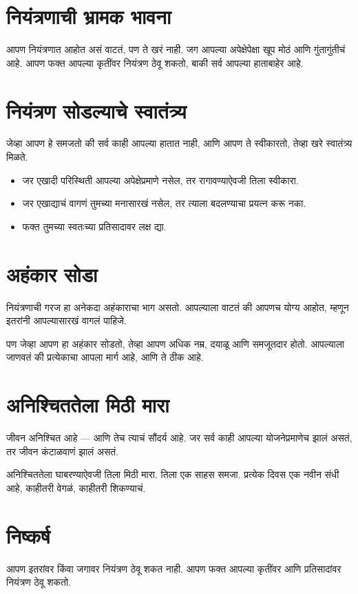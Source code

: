 \section*{नियंत्रणाची भ्रामक भावना}
आपण नियंत्रणात आहोत असं वाटतं,  
पण ते खरं नाही.  
जग आपल्या अपेक्षेपेक्षा खूप मोठं आणि गुंतागुंतीचं आहे.  
आपण फक्त आपल्या कृतींवर नियंत्रण ठेवू शकतो,  
बाकी सर्व आपल्या हाताबाहेर आहे.  

\section*{नियंत्रण सोडल्याचे स्वातंत्र्य}
जेव्हा आपण हे समजतो की सर्व काही आपल्या हातात नाही,  
आणि आपण ते स्वीकारतो,  
तेव्हा खरे स्वातंत्र्य मिळते.  

\begin{itemize}
\item जर एखादी परिस्थिती आपल्या अपेक्षेप्रमाणे नसेल, तर रागावण्याऐवजी तिला स्वीकारा.  
\item जर एखाद्याचं वागणं तुमच्या मनासारखं नसेल, तर त्याला बदलण्याचा प्रयत्न करू नका.  
\item फक्त तुमच्या स्वतःच्या प्रतिसादावर लक्ष द्या.  
\end{itemize}

\section*{अहंकार सोडा}
नियंत्रणाची गरज हा अनेकदा अहंकाराचा भाग असतो.  
आपल्याला वाटतं की आपणच योग्य आहोत,  
म्हणून इतरांनी आपल्यासारखं वागलं पाहिजे.  

पण जेव्हा आपण हा अहंकार सोडतो,  
तेव्हा आपण अधिक नम्र, दयाळू आणि समजूतदार होतो.  
आपल्याला जाणवतं की प्रत्येकाचा आपला मार्ग आहे,  
आणि ते ठीक आहे.  

\section*{अनिश्चिततेला मिठी मारा}
जीवन अनिश्चित आहे — आणि तेच त्याचं सौंदर्य आहे.  
जर सर्व काही आपल्या योजनेप्रमाणेच झालं असतं,  
तर जीवन कंटाळवाणं झालं असतं.  

अनिश्चिततेला घाबरण्याऐवजी तिला मिठी मारा.  
तिला एक साहस समजा.  
प्रत्येक दिवस एक नवीन संधी आहे,  
काहीतरी वेगळं, काहीतरी शिकण्याचं.  

\section*{निष्कर्ष}
आपण इतरांवर किंवा जगावर नियंत्रण ठेवू शकत नाही.  
आपण फक्त आपल्या कृतींवर आणि प्रतिसादांवर नियंत्रण ठेवू शकतो.  

